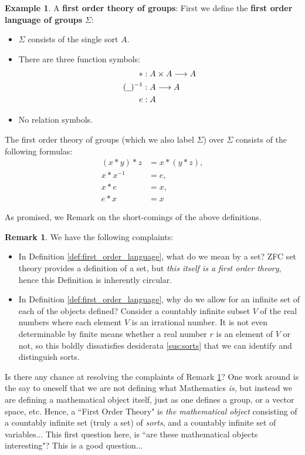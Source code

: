 \documentclass[12pt]{article}
\theoremstyle{plain}
\theoremstyle{definition}
\newtheorem{remark}[thm]{Remark}
\newtheorem{example}[thm]{Example}
\newcommand{\und}[1]{\underline{\hspace{#1 cm}}}
\newcommand{\lto}{\longrightarrow}
\begin{document}
	\begin{example}\label{ex:groups}
		A \textbf{first order theory of groups}:
		First we define the \textbf{first order language of groups} $\Sigma$:
		\begin{itemize}
			\item $\Sigma$ consists of the single sort $A$.
			\item There are three function symbols:
			\begin{align*}
				*&: A \times A \lto A\\
				(\und{0.2})^{-1}&: A \lto A\\
				e&: A
			\end{align*}
			\item No relation symbols.
		\end{itemize}
		The first order theory of groups (which we also label $\Sigma$) over $\Sigma$ consists of the following formulas:
		\begin{align*}
			(x * y) * z &= x * (y * z),\\
			x * x^{-1} &= e,\\
			x * e &= x,\\
			e * x &= x
		\end{align*}
	\end{example}
	As promised, we Remark on the short-comings of the above definitions.
	\begin{remark}\label{rmk:don't_believe_it}
		We have the following complaints:
		\begin{itemize}
			\item In Definition \ref{def:first_order_language}, what do we mean by a set? ZFC set theory provides a definition of a set, but \emph{this itself is a first order theory}, hence this Definition is inherently circular.
			\item In Definition \ref{def:first_order_language}, why do we allow for an infinite set of each of the objects defined? Consider a countably infinite subset $V$ of the real numbers where each element $V$ is an irrational number. It is not even determinable by finite means whether a real number $r$ is an element of $V$ or not, so this boldly dissatisfies desiderata \ref{sus:sorts} that we can identify and distinguish sorts.
		\end{itemize}
	\end{remark}
	Is there any chance at resolving the complaints of Remark \ref{rmk:don't_believe_it}? One work around is the say to oneself that we are not defining what Mathematics \emph{is}, but instead we are defining a mathematical object itself, just as one defines a group, or a vector space, etc. Hence, a ``First Order Theory" is \emph{the mathematical object} consisting of a countably infinite set (truly a set) of \emph{sorts}, and a countably infinite set of variables... This first question here, is ``are these mathematical objects interesting"? This is a good question...
	
\end{document}
